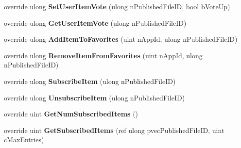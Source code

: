 \begin{DoxyCompactItemize}
\item 
\hypertarget{classValve_1_1Steamworks_1_1CSteamUGC_a6a100f0812c1d10493f9ba30f0701c08}{}override ulong {\bfseries Set\+User\+Item\+Vote} (ulong n\+Published\+File\+I\+D, bool b\+Vote\+Up)\label{classValve_1_1Steamworks_1_1CSteamUGC_a6a100f0812c1d10493f9ba30f0701c08}

\item 
\hypertarget{classValve_1_1Steamworks_1_1CSteamUGC_a2f0960e536afdc853822b2a04fce7165}{}override ulong {\bfseries Get\+User\+Item\+Vote} (ulong n\+Published\+File\+I\+D)\label{classValve_1_1Steamworks_1_1CSteamUGC_a2f0960e536afdc853822b2a04fce7165}

\item 
\hypertarget{classValve_1_1Steamworks_1_1CSteamUGC_aa15109e48e5a9d967f6a78d032ce9922}{}override ulong {\bfseries Add\+Item\+To\+Favorites} (uint n\+App\+Id, ulong n\+Published\+File\+I\+D)\label{classValve_1_1Steamworks_1_1CSteamUGC_aa15109e48e5a9d967f6a78d032ce9922}

\item 
\hypertarget{classValve_1_1Steamworks_1_1CSteamUGC_a97b9d0671dcb5c3656e5cfa9bc0b5e44}{}override ulong {\bfseries Remove\+Item\+From\+Favorites} (uint n\+App\+Id, ulong n\+Published\+File\+I\+D)\label{classValve_1_1Steamworks_1_1CSteamUGC_a97b9d0671dcb5c3656e5cfa9bc0b5e44}

\item 
\hypertarget{classValve_1_1Steamworks_1_1CSteamUGC_ab1f85f478d3b82e51e6d2fe76276758a}{}override ulong {\bfseries Subscribe\+Item} (ulong n\+Published\+File\+I\+D)\label{classValve_1_1Steamworks_1_1CSteamUGC_ab1f85f478d3b82e51e6d2fe76276758a}

\item 
\hypertarget{classValve_1_1Steamworks_1_1CSteamUGC_abfd8793bc8da34926642b9bef49fb1f4}{}override ulong {\bfseries Unsubscribe\+Item} (ulong n\+Published\+File\+I\+D)\label{classValve_1_1Steamworks_1_1CSteamUGC_abfd8793bc8da34926642b9bef49fb1f4}

\item 
\hypertarget{classValve_1_1Steamworks_1_1CSteamUGC_af2ded6182d558b070dda2a1b373372ce}{}override uint {\bfseries Get\+Num\+Subscribed\+Items} ()\label{classValve_1_1Steamworks_1_1CSteamUGC_af2ded6182d558b070dda2a1b373372ce}

\item 
\hypertarget{classValve_1_1Steamworks_1_1CSteamUGC_ac988522afdee36d9497e944f5797a529}{}override uint {\bfseries Get\+Subscribed\+Items} (ref ulong pvec\+Published\+File\+I\+D, uint c\+Max\+Entries)\label{classValve_1_1Steamworks_1_1CSteamUGC_ac988522afdee36d9497e944f5797a529}


\end{DoxyCompactItemize}
